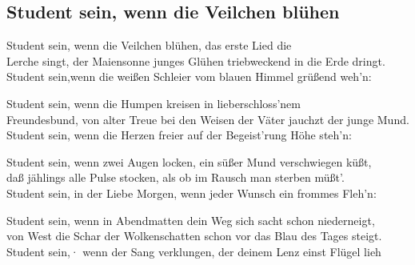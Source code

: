 
\subsection*{Student sein, wenn die Veilchen blühen}
%

\thestrophe Student sein, wenn die Veilchen blühen, das erste Lied die \\
Lerche singt, der Maiensonne junges Glühen triebweckend in die Erde dringt. \\
Student sein,wenn die weißen Schleier vom blauen Himmel grüßend weh'n: \\

\thestrophe Student sein, wenn die Humpen kreisen in lieberschloss'nem \\
Freundesbund, von alter Treue bei den Weisen der Väter jauchzt der junge Mund. \\
Student sein, wenn die Herzen freier auf der Begeist'rung Höhe steh'n: \\

\thestrophe Student sein, wenn zwei Augen locken, ein süßer Mund verschwiegen küßt, \\
daß jählings alle Pulse stocken, als ob im Rausch man sterben müßt'. \\
Student sein, in der Liebe Morgen, wenn jeder Wunsch ein frommes Fleh'n: \\

\thestrophe Student sein, wenn in Abendmatten dein Weg sich sacht schon niederneigt, \\
von West die Schar der Wolkenschatten schon vor das Blau des Tages steigt. \\
Student sein,· wenn der Sang verklungen, der deinem Lenz einst Flügel lieh \\
